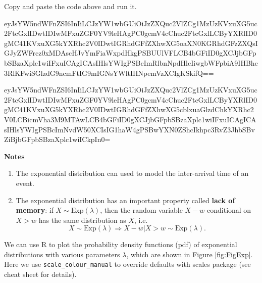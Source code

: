 \documentclass[landscape, 20pt]{extreport}
\theoremstyle{definition}
\theoremstyle{definition}
\theoremstyle{definition}
\theoremstyle{definition}
\theoremstyle{remark}
\begin{document}
Copy and paste the code above and run it.

eyJsYW5ndWFnZSI6InIiLCJzYW1wbGUiOiJzZXQuc2VlZCg1MzUzKVxuXG5uc2FtcGxlIDwtIDIwMFxuZGF0YV9leHAgPC0gcmV4cChuc2FtcGxlLCByYXRlID0gMC41KVxuXG5kYXRhc2V0IDwtIGRhdGFfZXhwXG5oaXN0KGRhdGFzZXQsIGJyZWFrcz0xMDAscHJvYmFiaWxpdHkgPSBUUlVFLCB4bGFiID0gXCJjbGFpbSBzaXplc1wiIFxuICAgICAsIHlsYWIgPSBcImRlbnNpdHlcIiwgbWFpbiA9IHBhc3RlKFwiSGlzdG9ncmFtIG9mIGNsYWltIHNpemVzXCIgKSkifQ==

eyJsYW5ndWFnZSI6InIiLCJzYW1wbGUiOiJzZXQuc2VlZCg1MzUzKVxuXG5uc2FtcGxlIDwtIDIwMFxuZGF0YV9leHAgPC0gcmV4cChuc2FtcGxlLCByYXRlID0gMC41KVxuXG5kYXRhc2V0IDwtIGRhdGFfZXhwXG5cblxuaGlzdChkYXRhc2V0LCBicmVha3M9MTAwLCB4bGFiID0gXCJjbGFpbSBzaXplc1wiIFxuICAgICAsIHlsYWIgPSBcImNvdW50XCIsIG1haW4gPSBwYXN0ZShcIkhpc3RvZ3JhbSBvZiBjbGFpbSBzaXplc1wiICkpIn0=

\textbf{Notes}

\begin{enumerate}
\def\labelenumi{\arabic{enumi}.}
\item
  The exponential distribution can used to model the inter-arrival
  time of an event.
\item
  The exponential distribution has an important property called \textbf{lack
  of memory}: if \(X \sim \text{Exp}(\lambda)\), then the random
  variable \(X-w\) conditional on \(X > w\) has the same distribution as
  \(X\), i.e.
  \[X \sim \text{Exp}(\lambda)\Rightarrow  X - w | X > w \sim \text{Exp}(\lambda).\]
\end{enumerate}

We can use R to plot the probability density functions (pdf) of exponential distributions with various parameters \(\lambda\), which are shown in Figure \ref{fig:FigExp}. Here we use \texttt{scale\_colour\_manual} to override defaults with scales package (see cheat sheet for details).
\end{document}
